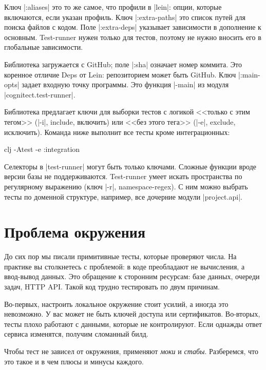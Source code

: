 Ключ \spverb|:aliases| это то же самое, что профили в \spverb|lein|: опции,
которые включаются, если указан профиль. Ключ \spverb|:extra-paths| это список
путей для поиска файлов с кодом. Поле \spverb|:extra-deps| указывает зависимости
в дополнение к основным. Test-runner нужен только для тестов, поэтому не нужно
вносить его в глобальные зависимости.

Библиотека загружается с GitHub; поле \spverb|:sha| означает номер коммита. Это
коренное отличие Deps от Lein: репозиторием может быть GitHub. Ключ
\spverb|:main-opts| задает входную точку программы. Это функция \spverb|-main|
из модуля \spverb|cognitect.test-runner|.

Библиотека предлагает ключи для выборки тестов с логикой <<только с этим тегом>>
(\spverb|-i|, include, включить) или <<без этого тега>> (\spverb|-e|, exclude,
исключить). Команда ниже выполнит все тесты кроме интеграционных:

\begin{english}
  \begin{bash}
clj -Atest -e :integration
  \end{bash}
\end{english}

Селекторы в \spverb|test-runner| могут быть только ключами. Сложные функции
вроде версии базы не поддерживаются. Test-runner умеет искать пространства по
регулярному выражению (ключ \spverb|-r|, namespace-regex). С ним можно выбрать
тесты по доменной структуре, например, все дочерние модули \spverb|project.api|.

\section{Проблема окружения}

До сих пор мы писали примитивные тесты, которые проверяют числа. На практике вы
столкнетесь с проблемой: в коде преобладают не вычисления, а ввод-вывод
данных. Это обращение к сторонним ресурсам: базе данных, очереди задач, HTTP
API. Такой код трудно тестировать по двум причинам.

Во-первых, настроить локальное окружение стоит усилий, а иногда это
невозможно. У вас может не быть ключей доступа или сертификатов. Во-вторых,
тесты плохо работают с данными, которые не контролируют. Если однажды ответ
сервиса изменятся, получим сломанный билд.

Чтобы тест не зависел от окружения, применяют \emph{моки} и
\emph{стабы}. Разберемся, что это такое и в чем плюсы и минусы каждого.


